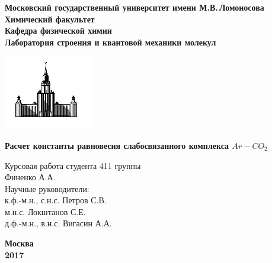 \begin{titlepage}
\centering
\textbf{\large Московский государственный университет имени М.В.\,Ломоносова\\
\vspace*{0.1cm} Химический факультет\\
\vspace*{0.1cm}
\noindent\makebox[\linewidth]{\rule{\paperwidth}{0.4pt}}
\vspace*{0.1cm}
 Кафедра физической химии\\
\vspace*{0.1cm} Лаборатория строения и квантовой механики молекул \\}
\vspace*{2cm}

\begin{center}
\includegraphics[width=0.3\textwidth]{pictures/logo.jpg}
\end{center}

\vspace*{2cm}
\Large \textbf{Расчет константы равновесия слабосвязанного комплекса $Ar-CO_2$}
\vspace*{2cm}

\begin{flushright}
\large Курсовая работа студента 411 группы\\
Финенко А.А.\\
\vspace{1cm}
Научные руководители:\\
к.ф.-м.н., с.н.с. Петров С.В. \\
м.н.с. Локштанов С.Е. \\
д.ф.-м.н., в.н.с. Вигасин А.А.
\end{flushright}
\vfill
\large\textbf{Москва\\ 2017}
\end{titlepage}

